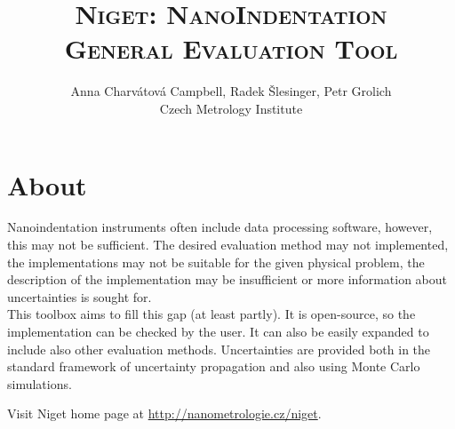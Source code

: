 \documentclass[a4paper,11pt,onepage]{article}
\title{\textsc{Niget: NanoIndentation \\ General Evaluation Tool}}
\author{Anna Charvátová Campbell, Radek Šlesinger, Petr Grolich \\ Czech Metrology Institute}
\begin{document}
\maketitle

\tableofcontents

\section{About}

Nanoindentation instruments often include data processing software, however, this may not be sufficient. 
The desired evaluation method may not implemented, the implementations may not be suitable for the given physical problem, 
the description of the implementation may be insufficient or more information about uncertainties is sought for. \\
This toolbox aims to fill this gap (at least partly). It is open-source, so the implementation can be checked by the user. It can also be easily expanded to include also other evaluation methods.
Uncertainties are provided both in the standard framework of uncertainty propagation and also using Monte Carlo simulations.

Visit Niget home page at \url{http://nanometrologie.cz/niget}.




\newpage




























%


\end{document}
